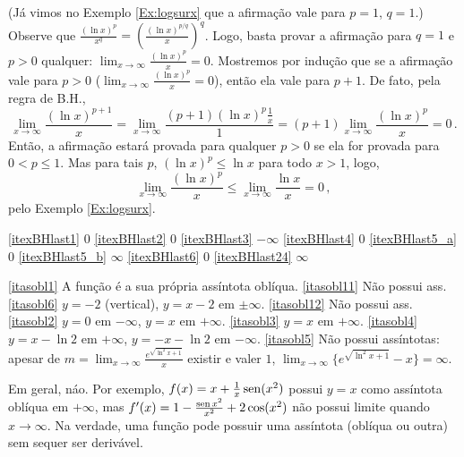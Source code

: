 \begin{Solution}{8.1}
(Já vimos no Exemplo \ref{Ex:logsurx} que a afirmação vale para $p=1$, $q=1$.)
Observe que
$\frac{(\ln
x)^p}{x^q}=(\frac{(\ln
x)^{p/q}}{x})^q$. Logo, basta provar a afirmação para $q=1$ e $p>0$ qualquer:
$\lim_{x\to \infty}\frac{(\ln
x)^p}{x}=0$.
Mostremos por indução que se a afirmação vale para $p>0$
($\lim_{x\to \infty}\frac{(\ln
x)^{p}}{x}=0$), então ela vale para $p+1$. De fato, pela regra de B.H.,
$$
\lim_{x\to \infty}\frac{(\ln x)^{p+1}}{x}=\lim_{x\to \infty}\frac{(p+1)(\ln
x)^{p}\tfrac{1}{x}}{1}=
(p+1)\lim_{x\to \infty}\frac{(\ln
x)^{p}}{x}=0\,.
$$
Então, a afirmação estará provada para qualquer $p>0$ se ela for provada para
$0<p\leq 1$. Mas para tais $p$, $(\ln x)^p\leq \ln x$ para todo $x>1$, logo,
$$
\lim_{x\to \infty}\frac{(\ln x)^p}{x}\leq \lim_{x\to \infty}\frac{\ln x}{x}=0\,,
$$
pelo Exemplo \ref{Ex:logsurx}.
\end{Solution}
\begin{Solution}{8.3}
\eqref{itexBHlast1} $0$
\eqref{itexBHlast2} $0$
\eqref{itexBHlast3} $-\infty$
\eqref{itexBHlast4} $0$
\eqref{itexBHlast5_a} $0$
\eqref{itexBHlast5_b} $\infty$
\eqref{itexBHlast6} $0$
\eqref{itexBHlast24} $\infty$
\end{Solution}
\begin{Solution}{8.4}
\eqref{itasobl1} A função é a sua própria assíntota oblíqua.
\eqref{itasobl11} Não possui ass.
\eqref{itasobl6} $y=-2$ (vertical), $y=x-2$ em $\pm\infty$.
\eqref{itasobl12} Não possui ass.
\eqref{itasobl2} $y=0$ em $-\infty$, $y=x$ em $+\infty$.
\eqref{itasobl3} $y=x$ em $+\infty$.
\eqref{itasobl4} $y=x-\ln 2$ em $+\infty$, $y=-x-\ln 2$ em
$-\infty$.
\eqref{itasobl5} Não possui assíntotas: apesar de
$m=\lim_{x\to \infty}\frac{e^{\sqrt{\ln^2x+1}}}{x}$
existir e valer $1$,
$\lim_{x\to\infty}\{e^{\sqrt{\ln^2x+1}}-x\}=\infty$.
\end{Solution}
\begin{Solution}{8.5}
Em geral, náo.
Por exemplo, $f(x)=x+\tfrac{1}{x}\operatorname{sen} (x^2)$ possui $y=x$ como assíntota
oblíqua em $+\infty$,
mas $f'(x)=1-\frac{\operatorname{sen} x^2}{x^2}+2\cos (x^2)$
não possui limite quando $x\to\infty$.
Na verdade, uma função pode possuir uma assíntota (oblíqua ou
outra)
sem sequer ser derivável.
\end{Solution}
